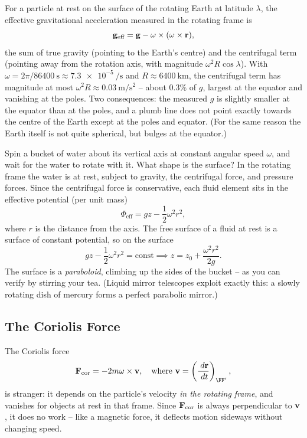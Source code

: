 \documentclass[a4paper]{scrartcl}
\begin{document}
\begin{example}
	For a particle at rest on the surface of the rotating Earth at latitude $\lambda$, the effective gravitational acceleration measured in the rotating frame is
	$$
	\mathbf{g}_{\text{eff}} = \mathbf{g} - \mathbf{\omega} \times (\mathbf{\omega} \times \mathbf{r}),
	$$
	the sum of true gravity (pointing to the Earth's centre) and the centrifugal term (pointing away from the rotation axis, with magnitude $\omega^2 R \cos \lambda$). With $\omega = 2\pi/\SI{86400}{\second} \approx \SI{7.3e-5}{\per\second}$ and $R \approx \SI{6400}{\kilo\meter}$, the centrifugal term has magnitude at most $\omega^2 R \approx \SI{0.03}{\meter\per\second\squared}$ -- about $0.3\%$ of $g$, largest at the equator and vanishing at the poles. Two consequences: the measured $g$ is slightly smaller at the equator than at the poles, and a plumb line does not point exactly towards the centre of the Earth except at the poles and equator. (For the same reason the Earth itself is not quite spherical, but bulges at the equator.)
\end{example}

\begin{example}
	Spin a bucket of water about its vertical axis at constant angular speed $\omega$, and wait for the water to rotate with it. What shape is the surface? In the rotating frame the water is at rest, subject to gravity, the centrifugal force, and pressure forces. Since the centrifugal force is conservative, each fluid element sits in the effective potential (per unit mass)
	$$
	\Phi_{\text{eff}} = g z - \frac{1}{2}\omega^2 r^2,
	$$
	where $r$ is the distance from the axis. The free surface of a fluid at rest is a surface of constant potential, so on the surface
	$$
	gz - \frac{1}{2}\omega^2 r^2 = \text{const} \implies z = z_0 + \frac{\omega^2 r^2}{2g}.
	$$
	The surface is a \emph{paraboloid}, climbing up the sides of the bucket -- as you can verify by stirring your tea. (Liquid mirror telescopes exploit exactly this: a slowly rotating dish of mercury forms a perfect parabolic mirror.)
\end{example}

\subsection{The Coriolis Force}

The Coriolis force
$$
\vv F_{\text{cor}} = -2m \vv \omega \times \vv v, \quad \text{where } \vv v = \left(\frac{\dd \vv r}{\dd t}\right)_{\FF'},
$$
is stranger: it depends on the particle's velocity \emph{in the rotating frame}, and vanishes for objects at rest in that frame. Since $\mathbf{F}_{\text{cor}}$ is always perpendicular to $\mathbf{v}$, it does no work -- like a magnetic force, it deflects motion sideways without changing speed.
\end{document}
